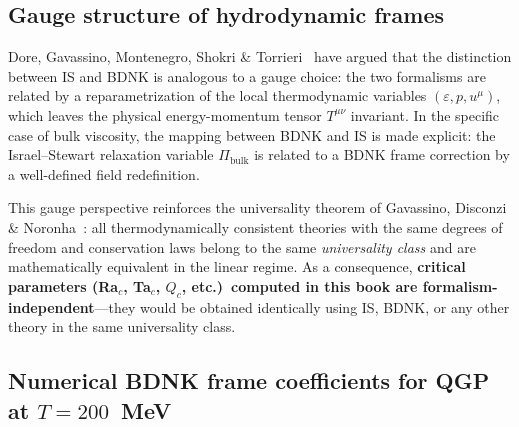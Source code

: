 \subsection{Gauge structure of hydrodynamic frames}

Dore, Gavassino, Montenegro, Shokri \&
Torrieri~\cite{DoreGavassinoGauge2022} have argued that the
distinction between IS and BDNK is analogous to a gauge choice: the
two formalisms are related by a reparametrization of the local
thermodynamic variables $(\varepsilon, p, u^{\mu})$, which leaves the
physical energy-momentum tensor $T^{\mu\nu}$ invariant.  In the
specific case of bulk viscosity, the mapping between BDNK and IS is
made explicit: the Israel--Stewart relaxation variable
$\Pi_{\mathrm{bulk}}$ is related to a BDNK frame correction by a
well-defined field redefinition.

This gauge perspective reinforces the universality theorem of
Gavassino, Disconzi \& Noronha~\cite{GavassinoUniversality1,
GavassinoUniversality2}: all thermodynamically consistent theories
with the same degrees of freedom and conservation laws belong to the
same \emph{universality class} and are mathematically equivalent in
the linear regime.  As a consequence, \textbf{critical parameters
(Ra$_{c}$, Ta$_{c}$, $Q_{c}$, etc.)\ computed in this book are
formalism-independent}---they would be obtained identically using IS,
BDNK, or any other theory in the same universality class.

\subsection{Numerical BDNK frame coefficients for QGP at $T=200$~MeV}


